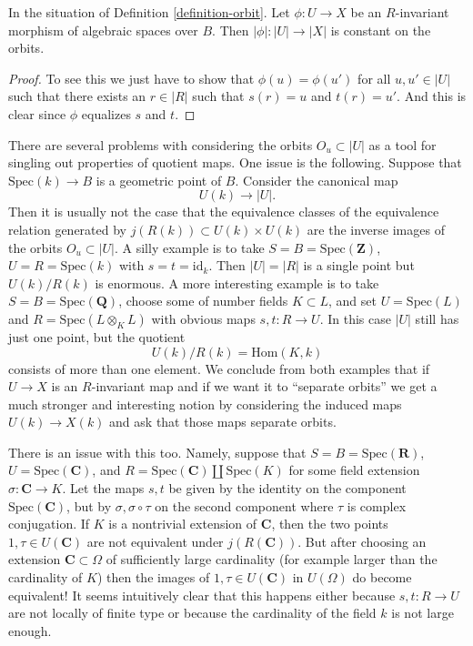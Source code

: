 \begin{lemma}
\label{lemma-invariant-map-constant-on-orbit}
In the situation of Definition \ref{definition-orbit}.
Let $\phi : U \to X$ be an $R$-invariant morphism of algebraic spaces over
$B$. Then $|\phi| : |U| \to |X|$ is constant on the orbits.
\end{lemma}

\begin{proof}
To see this we just have to show that $\phi(u) = \phi(u')$
for all $u, u' \in |U|$ such that
there exists an $r \in |R|$ such that $s(r) = u$ and $t(r) = u'$.
And this is clear since $\phi$ equalizes $s$ and $t$.
\end{proof}

\noindent
There are several problems with considering the orbits $O_u \subset |U|$
as a tool for singling out properties of quotient maps. One issue is the
following. Suppose that $\text{Spec}(k) \to B$
is a geometric point of $B$. Consider the canonical map
$$
U(k) \longrightarrow |U|.
$$
Then it is usually not the case that the equivalence classes
of the equivalence relation generated by $j(R(k)) \subset U(k) \times U(k)$
are the inverse images of the orbits $O_u \subset |U|$.
A silly example is to take $S = B = \text{Spec}(\mathbf{Z})$,
$U = R = \text{Spec}(k)$ with $s = t = \text{id}_k$. Then $|U| = |R|$ is
a single point but $U(k)/R(k)$ is enormous.
A more interesting example is to take $S = B = \text{Spec}(\mathbf{Q})$,
choose some of number fields $K \subset L$, and set $U = \text{Spec}(L)$
and $R = \text{Spec}(L \otimes_K L)$ with obvious maps $s, t : R \to U$.
In this case $|U|$ still has just one point, but the quotient
$$
U(k)/R(k) = \text{Hom}(K, k)
$$
consists of more than one element. We conclude from both examples
that if $U \to X$ is an $R$-invariant map and if we want it to
``separate orbits'' we get a much stronger and interesting notion by
considering the induced maps $U(k) \to X(k)$ and ask that
those maps separate orbits.

\medskip\noindent
There is an issue with this too. Namely, suppose that
$S = B = \text{Spec}(\mathbf{R})$,
$U = \text{Spec}(\mathbf{C})$, and
$R = \text{Spec}(\mathbf{C}) \amalg \text{Spec}(K)$
for some field extension $\sigma : \mathbf{C} \to K$.
Let the maps $s, t$ be given by the identity on the component
$\text{Spec}(\mathbf{C})$, but by $\sigma, \sigma \circ \tau$ on the
second component where $\tau$ is complex conjugation. If
$K$ is a nontrivial extension of $\mathbf{C}$, then the two points
$1, \tau \in U(\mathbf{C})$ are not equivalent under
$j(R(\mathbf{C}))$. But after choosing an extension $\mathbf{C} \subset \Omega$
of sufficiently large cardinality (for example larger than the cardinality
of $K$) then the images of $1, \tau \in U(\mathbf{C})$ in
$U(\Omega)$ do become equivalent! It seems intuitively clear that
this happens either because $s, t : R \to U$ are not locally of finite type
or because the cardinality of the field $k$ is not large enough.

